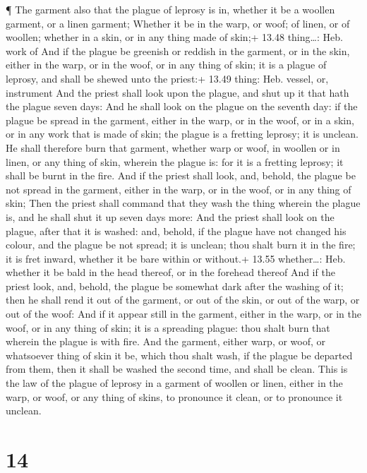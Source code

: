  ¶ The garment also that the plague of leprosy is in,
whether it be a woollen garment, or a linen garment; 
Whether it be in the warp, or woof; of linen, or of woollen; whether in
a skin, or in any thing made of skin;+ 13.48 thing\ldots: Heb. work of
 And if the plague be greenish or reddish in the garment,
or in the skin, either in the warp, or in the woof, or in any thing of
skin; it is a plague of leprosy, and shall be shewed unto the priest:+
13.49 thing: Heb. vessel, or, instrument  And the priest
shall look upon the plague, and shut up it that hath the plague seven
days:  And he shall look on the plague on the seventh day:
if the plague be spread in the garment, either in the warp, or in the
woof, or in a skin, or in any work that is made of skin; the plague is a
fretting leprosy; it is unclean.  He shall therefore burn
that garment, whether warp or woof, in woollen or in linen, or any thing
of skin, wherein the plague is: for it is a fretting leprosy; it shall
be burnt in the fire.  And if the priest shall look, and,
behold, the plague be not spread in the garment, either in the warp, or
in the woof, or in any thing of skin;  Then the priest
shall command that they wash the thing wherein the plague is, and he
shall shut it up seven days more:  And the priest shall
look on the plague, after that it is washed: and, behold, if the plague
have not changed his colour, and the plague be not spread; it is
unclean; thou shalt burn it in the fire; it is fret inward, whether it
be bare within or without.+ 13.55 whether\ldots: Heb. whether it be bald
in the head thereof, or in the forehead thereof  And if the
priest look, and, behold, the plague be somewhat dark after the washing
of it; then he shall rend it out of the garment, or out of the skin, or
out of the warp, or out of the woof:  And if it appear
still in the garment, either in the warp, or in the woof, or in any
thing of skin; it is a spreading plague: thou shalt burn that wherein
the plague is with fire.  And the garment, either warp, or
woof, or whatsoever thing of skin it be, which thou shalt wash, if the
plague be departed from them, then it shall be washed the second time,
and shall be clean.  This is the law of the plague of
leprosy in a garment of woollen or linen, either in the warp, or woof,
or any thing of skins, to pronounce it clean, or to pronounce it
unclean.

\hypertarget{section-13}{%
\section{14}\label{section-13}}

